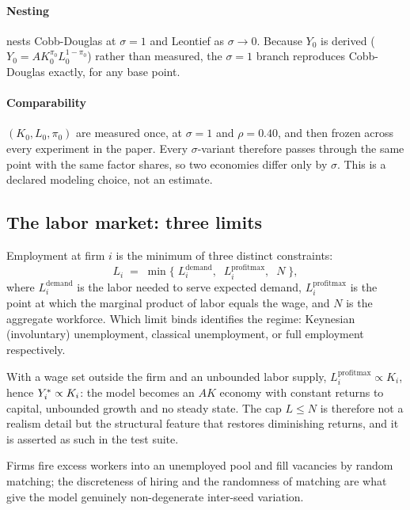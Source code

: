 \paragraph{Nesting}  nests Cobb-Douglas at $\sigma = 1$
and Leontief as $\sigma \to 0$. Because $Y_0$ is derived
($Y_0 = A K_0^{\pi_0} L_0^{1-\pi_0}$) rather than measured, the $\sigma = 1$
branch reproduces Cobb-Douglas exactly, for any base point.
\paragraph{Comparability} $(K_0, L_0, \pi_0)$ are measured once, at
$\sigma = 1$ and $\rho = 0.40$, and then frozen across every
experiment in the paper. Every $\sigma$-variant therefore passes through the
same point with the same factor shares, so two economies differ only
by $\sigma$. This is a declared modeling choice, not an estimate.

\subsection{The labor market: three limits}

Employment at firm $i$ is the minimum of three distinct constraints:
\begin{equation}
  L_i \;=\; \min\big\{\; L^{\mathrm{demand}}_i,\;\;
                        L^{\mathrm{profitmax}}_i,\;\;
                        N \;\big\},
  \label{eq:labor}
\end{equation}
where $L^{\mathrm{demand}}_i$ is the labor needed to serve expected demand,
$L^{\mathrm{profitmax}}_i$ is the point at which the marginal product of
labor equals the wage, and $N$ is the aggregate workforce. Which limit binds
identifies the regime: Keynesian (involuntary) unemployment, classical
unemployment, or full employment respectively.

\begin{modelassumption}
With a wage set outside the firm and an unbounded labor supply,
$L^{\mathrm{profitmax}}_i \propto K_i$, hence $Y^{\ast}_i \propto K_i$: the
model becomes an $AK$ economy with constant returns to capital, unbounded
growth and no steady state. The cap $L \le N$ is therefore not a realism
detail but the structural feature that restores diminishing returns, and it
is asserted as such in the test suite.
\end{modelassumption}

Firms fire excess workers into an unemployed pool and fill vacancies by
random matching; the discreteness of hiring and the randomness of matching are
what give the model genuinely non-degenerate inter-seed variation.

